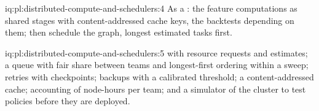 \begin{solution}{iq:pl:distributed-compute-and-schedulers:4}
As a : the feature computations as shared stages with content-addressed cache keys, the backtests depending on them; then schedule
the graph, longest estimated tasks first.
\end{solution}

\begin{solution}{iq:pl:distributed-compute-and-schedulers:5}
 with resource requests and estimates; a queue with fair share between teams and longest-first ordering within a sweep; retries
with checkpoints; backups with a calibrated threshold; a content-addressed cache; accounting of node-hours per team; and a simulator of the
cluster to test policies before they are deployed.
\end{solution}
